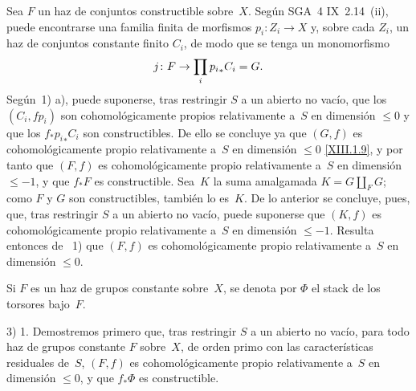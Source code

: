 \shorthandoff{<>}%


Sea $F$ un haz de conjuntos constructible sobre~$X$. Según
SGA~4 IX~2.14~(ii), puede encontrarse una familia finita de morfismos
$p_i \colon Z_i \to X$ y, sobre cada $Z_i$, un haz de conjuntos
constante finito $C_i$, de modo que se tenga un monomorfismo
$$
j \colon F \to \prod_{i} {p_i}_* C_i =G .
$$
Según~1)\kern2pt a), puede suponerse, tras restringir $S$ a un abierto
no vacío, que los $(C_i,fp_i)$ son cohomológicamente propios relativamente
a~$S$ en dimensión $\leqslant 0$ y que los $f_*{p_i}_*C_i$ son
constructibles. De ello se concluye ya que $(G,f)$ es
cohomológicamente propio relativamente a~$S$ en dimensión $\leqslant 0$
\eqref{XIII.1.9}, y por tanto que $(F,f)$ es cohomológicamente propio
relativamente a~$S$ en dimensión $\leqslant -1$, y que $f_*F$ es
constructible. Sea~$K$ la suma amalgamada $K= G \coprod_{F} G$;
como $F$ y $G$ son constructibles, también lo es~$K$. De lo anterior
se concluye, pues, que, tras restringir $S$ a un abierto no vacío, puede
suponerse que $(K,f)$ es cohomológicamente propio relativamente a~$S$
en dimensión $\leqslant -1$. Resulta entonces de
~1) que $(F,f)$ es cohomológicamente propio relativamente
a~$S$ en dimensión $\leqslant 0$.


Si $F$ es un haz de grupos constante sobre~$X$, se denota por $\Phi$ el
stack de los torsores bajo~$F$.

3) 1. Demostremos primero que, tras restringir $S$ a un abierto no
vacío, para todo haz de grupos constante $F$ sobre~$X$, de orden primo
con las características residuales de~$S$, $(F,f)$ es cohomológicamente
propio relativamente a~$S$ en dimensión $\leqslant 0$, y que
$f_*\Phi$ es constructible.

